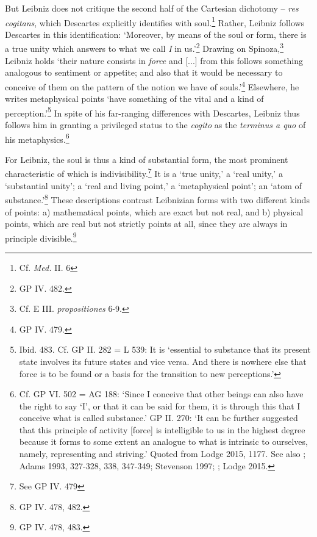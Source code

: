 \documentclass{article}
\begin{document}
But Leibniz does not critique the second half of the Cartesian dichotomy
-- \emph{res cogitans}, which Descartes explicitly identifies with
soul.\footnote{Cf. \emph{Med.} II. 6} Rather, Leibniz follows Descartes
in this identification: `Moreover, by means of the soul or form, there
is a true unity which answers to what we call \emph{I} in us.'\footnote{GP
  IV. 482.} Drawing on Spinoza,\footnote{Cf. E III. \emph{propositiones}
  6-9.} Leibniz holds `their nature consists in \emph{force} and
{[}...{]} from this follows something analogous to sentiment or
appetite; and also that it would be necessary to conceive of them on the
pattern of the notion we have of souls.'\footnote{GP IV. 479.}
Elsewhere, he writes metaphysical points `have something of the vital
and a kind of perception.'\footnote{Ibid. 483. Cf. GP II. 282 = L 539:
  It is `essential to substance that its present state involves its
  future states and vice versa. And there is nowhere else that force is
  to be found or a basis for the transition to new perceptions.'} In
spite of his far-ranging differences with Descartes, Leibniz thus
follows him in granting a privileged status to the \emph{cogito} as the
\emph{terminus a quo} of his metaphysics.\footnote{Cf. GP VI. 502 = AG
  188: `Since I conceive that other beings can also have the right to
  say `I', or that it can be said for them, it is through this that I
  conceive what is called substance.' GP II. 270: `It can be further
  suggested that this principle of activity {[}force{]} is intelligible
  to us in the highest degree because it forms to some extent an
  analogue to what is intrinsic to ourselves, namely, representing and
  striving.' Quoted from Lodge 2015, 1177. See also \autocite[329-331]{Huffman1993}; Adams 1993, 327-328, 338, 347-349; Stevenson 1997; \autocite[63-81]{Heidegger1998}; Lodge 2015.}

For Leibniz, the soul is thus a kind of substantial form, the most
prominent characteristic of which is indivisibility.\footnote{See GP IV.
  479} It is a `true unity,' a `real unity,' a `substantial unity'; a
`real and living point,' a `metaphysical point'; an `atom of
substance.'\footnote{GP IV. 478, 482.} These descriptions contrast
Leibnizian forms with two different kinds of points: a) mathematical
points, which are exact but not real, and b) physical points, which are
real but not strictly points at all, since they are always in principle
divisible.\footnote{GP IV. 478, 483.}
\end{document}
